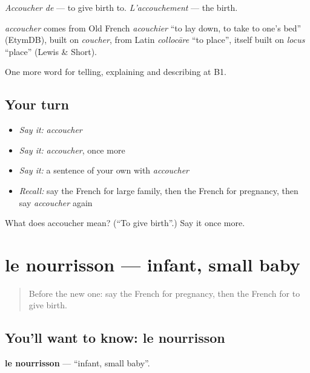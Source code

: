 \emph{Accoucher de} — to give birth to. \emph{L'accouchement} — the birth.

\begin{cousinweb}
\emph{accoucher} comes from Old French \emph{acouchier} \textquotedblleft{}to lay down, to take to one's bed\textquotedblright{} (EtymDB), built on \emph{coucher}, from Latin \emph{collocāre} \textquotedblleft{}to place\textquotedblright{}, itself built on \emph{locus} \textquotedblleft{}place\textquotedblright{} (Lewis \& Short).
\end{cousinweb}

\begin{grammarlens}[title={What you've built}]
One more word for telling, explaining and describing at B1.
\end{grammarlens}

\subsection*{Your turn}
\begin{itemize}
\raggedright
  \item \emph{Say it:} \emph{accoucher}
  \item \emph{Say it:} \emph{accoucher}, once more
  \item \emph{Say it:} a sentence of your own with \emph{accoucher}
  \item \emph{Recall:} say the French for large family, then the French for pregnancy, then say \emph{accoucher} again
\end{itemize}

\begin{tcolorbox}[breakable,colback=teal!4,colframe=teal!35!black,title={Before you move on}]
What does accoucher mean? (\textquotedblleft{}To give birth\textquotedblright{}.) Say it once more.
\end{tcolorbox}
\section[le nourrisson]{le nourrisson — infant, small baby}

\label{lesson:FR-C493-nourrisson}



\begin{quote}
Before the new one: say the French for pregnancy, then the French for to give birth.
\end{quote}

\subsection*{You'll want to know: le nourrisson}
\textbf{le nourrisson} — \textquotedblleft{}infant, small baby\textquotedblright{}.

